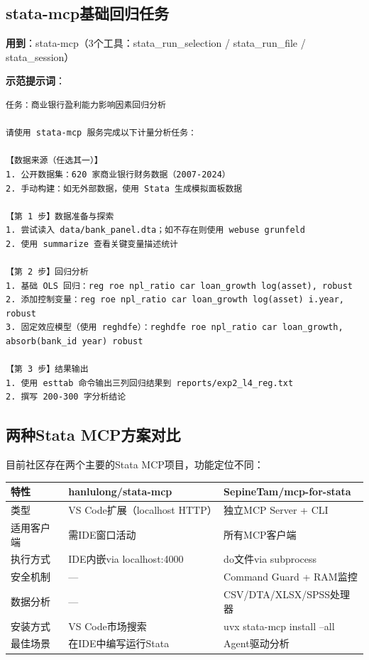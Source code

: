 \subsection{stata-mcp基础回归任务}

\textbf{用到}：stata-mcp（3个工具：stata\_run\_selection / stata\_run\_file / stata\_session）

\textbf{示范提示词}：

\begin{lstlisting}
任务：商业银行盈利能力影响因素回归分析

请使用 stata-mcp 服务完成以下计量分析任务：

【数据来源（任选其一）】
1. 公开数据集：620 家商业银行财务数据（2007-2024）
2. 手动构建：如无外部数据，使用 Stata 生成模拟面板数据

【第 1 步】数据准备与探索
1. 尝试读入 data/bank_panel.dta；如不存在则使用 webuse grunfeld
2. 使用 summarize 查看关键变量描述统计

【第 2 步】回归分析
1. 基础 OLS 回归：reg roe npl_ratio car loan_growth log(asset), robust
2. 添加控制变量：reg roe npl_ratio car loan_growth log(asset) i.year, robust
3. 固定效应模型（使用 reghdfe）：reghdfe roe npl_ratio car loan_growth, absorb(bank_id year) robust

【第 3 步】结果输出
1. 使用 esttab 命令输出三列回归结果到 reports/exp2_l4_reg.txt
2. 撰写 200-300 字分析结论
\end{lstlisting}

\subsection{两种Stata MCP方案对比}

目前社区存在两个主要的Stata MCP项目，功能定位不同：

\begin{table}[H]
\centering
\begin{tabular}{lp{5cm}p{5cm}}
\toprule
\textbf{特性} & \textbf{hanlulong/stata-mcp} & \textbf{SepineTam/mcp-for-stata} \\
\midrule
类型 & VS Code扩展（localhost HTTP） & 独立MCP Server + CLI \\
适用客户端 & 需IDE窗口活动 & 所有MCP客户端 \\
执行方式 & IDE内嵌via localhost:4000 & do文件via subprocess \\
安全机制 & --- & Command Guard + RAM监控 \\
数据分析 & --- & CSV/DTA/XLSX/SPSS处理器 \\
安装方式 & VS Code市场搜索 & uvx stata-mcp install --all \\
最佳场景 & 在IDE中编写运行Stata & Agent驱动分析 \\
\bottomrule
\end{tabular}
\end{table}

